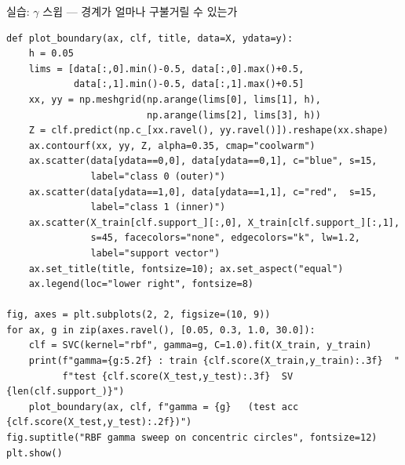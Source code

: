\begin{frame}[fragile,shrink=21]{실습: $\gamma$ 스윕 — 경계가 얼마나 구불거릴 수 있는가}
  \begin{lstlisting}
def plot_boundary(ax, clf, title, data=X, ydata=y):
    h = 0.05
    lims = [data[:,0].min()-0.5, data[:,0].max()+0.5,
            data[:,1].min()-0.5, data[:,1].max()+0.5]
    xx, yy = np.meshgrid(np.arange(lims[0], lims[1], h),
                         np.arange(lims[2], lims[3], h))
    Z = clf.predict(np.c_[xx.ravel(), yy.ravel()]).reshape(xx.shape)
    ax.contourf(xx, yy, Z, alpha=0.35, cmap="coolwarm")
    ax.scatter(data[ydata==0,0], data[ydata==0,1], c="blue", s=15,
               label="class 0 (outer)")
    ax.scatter(data[ydata==1,0], data[ydata==1,1], c="red",  s=15,
               label="class 1 (inner)")
    ax.scatter(X_train[clf.support_][:,0], X_train[clf.support_][:,1],
               s=45, facecolors="none", edgecolors="k", lw=1.2,
               label="support vector")
    ax.set_title(title, fontsize=10); ax.set_aspect("equal")
    ax.legend(loc="lower right", fontsize=8)

fig, axes = plt.subplots(2, 2, figsize=(10, 9))
for ax, g in zip(axes.ravel(), [0.05, 0.3, 1.0, 30.0]):
    clf = SVC(kernel="rbf", gamma=g, C=1.0).fit(X_train, y_train)
    print(f"gamma={g:5.2f} : train {clf.score(X_train,y_train):.3f}  "
          f"test {clf.score(X_test,y_test):.3f}  SV {len(clf.support_)}")
    plot_boundary(ax, clf, f"gamma = {g}   (test acc {clf.score(X_test,y_test):.2f})")
fig.suptitle("RBF gamma sweep on concentric circles", fontsize=12)
plt.show()
\end{lstlisting}
\end{frame}
